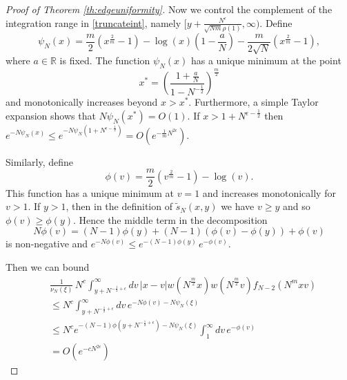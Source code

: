 \documentclass[11pt,reqno]{amsproc}
\numberwithin{equation}{section}
\numberwithin{theorem}{section}
\begin{document}
\begin{proof}[Proof of Theorem \ref{th:edgeuniformity}]
Now we control the complement of the integration range in \eqref{truncateint}, namely $[y+\frac{N^{\epsilon}}{\sqrt{Nm}\rho(1)},\infty)$. Define
\begin{equation}
\psi_{N}(x) = \frac{m}{2}(x^{\frac{2}{m}}-1)-\log(x)\left(1-\frac{a}{N}\right)-\frac{m}{2\sqrt{N}}(x^{\frac{2}{m}}-1),
\end{equation}
where $a \in \mathbb{R}$ is fixed. The function $\psi_{N}(x)$ has a unique minimum at the point
\begin{equation}
x^{*} = \left(\frac{1+\frac{a}{N}}{1-N^{-\frac{1}{2}}}\right)^{\frac{m}{2}}
\end{equation}
and monotonically increases beyond $x > x^{*}$. Furthermore, a simple Taylor expansion shows that $N\psi_{N}(x^{*}) = O(1)$. If $x > 1+N^{\epsilon-\frac{1}{2}}$ then $e^{-N\psi_{N}(x)} \leq e^{-N\psi_{N}(1+N^{\epsilon-\frac{1}{2}})} = O(e^{-\frac{1}{m}N^{2\epsilon}})$. 

Similarly, define
\begin{equation}
\phi(v) = \frac{m}{2}(v^{\frac{2}{m}}-1)-\log(v).
\end{equation}
This function has a unique minimum at $v=1$ and increases monotonically for $v >1$. If $y>1$, then in the definition of $\tilde{s}_{N}(x,y)$ we have $v\geq y$ and so $\phi(v) \geq \phi(y)$. Hence the middle term in the decomposition
\begin{equation}
N\phi(v) = (N-1)\phi(y) + (N-1)(\phi(v)-\phi(y)) + \phi(v) \label{saddledecomp}
\end{equation}
is non-negative and $e^{-N\phi(v)} \leq e^{-(N-1)\phi(y)}\,e^{-\phi(v)}$. 

Then we can bound
\begin{equation}
\begin{split}
&\frac{1}{\nu_{N}(\xi)}\,N^{c}\int_{y+N^{-\frac{1}{2}+\epsilon}}^{\infty}dv\,|x-v|w(N^{\frac{m}{2}}x)w(N^{\frac{m}{2}}v)f_{N-2}(N^{m}xv)\\
&\leq N^{c}\int_{y+N^{-\frac{1}{2}+\epsilon}}^{\infty}dv\,e^{-N\phi(v)-N\psi_{N}(\xi)}\\
&\leq N^{c}e^{-(N-1)\phi\left(y+N^{-\frac{1}{2}+\epsilon}\right)-N\psi_{N}(\xi)}\int_{1}^{\infty}dv\,e^{-\phi(v)}\\
&=O(e^{-cN^{2\epsilon}})
\end{split}
\end{equation}


\end{proof}
\end{document}
